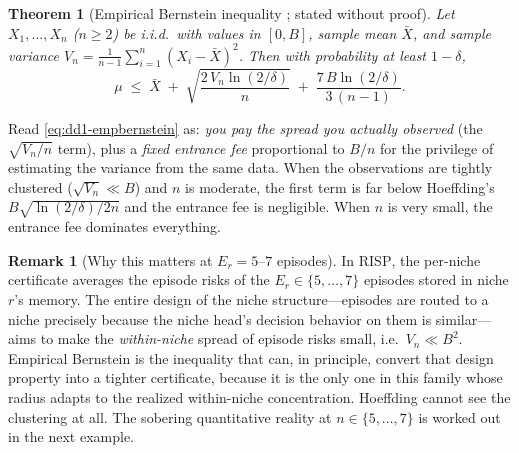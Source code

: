 \documentclass[11pt,a4paper]{article}
\theoremstyle{definition}
\newtheorem{remark}{Remark}[section]
\theoremstyle{plain}
\newtheorem{theorem}{Theorem}[section]
\newcommand{\nm}{\textsc{RISP}}
\begin{document}
\begin{theorem}[Empirical Bernstein inequality \cite{maurer2009empirical};
stated without proof]
\label{thm:dd1-empbernstein}
Let $X_1, \dots, X_n$ ($n \ge 2$) be i.i.d.\ with values in $[0, B]$, sample
mean $\bar{X}$, and sample variance
$V_n = \frac{1}{n - 1}\sum_{i=1}^n (X_i - \bar{X})^2$. Then with probability
at least $1 - \delta$,
\begin{equation}
\label{eq:dd1-empbernstein}
\mu \;\le\; \bar{X} \;+\; \sqrt{ \frac{2\, V_n \ln(2/\delta)}{n} }
\;+\; \frac{7\, B \ln(2/\delta)}{3\,(n - 1)} .
\end{equation}
\end{theorem}

\begin{intuition}
Read \eqref{eq:dd1-empbernstein} as: \emph{you pay the spread you actually
observed} (the $\sqrt{V_n/n}$ term), plus a \emph{fixed entrance fee}
proportional to $B/n$ for the privilege of estimating the variance from the
same data. When the observations are tightly clustered ($\sqrt{V_n} \ll B$)
and $n$ is moderate, the first term is far below Hoeffding's
$B\sqrt{\ln(2/\delta)/2n}$ and the entrance fee is negligible. When $n$ is
very small, the entrance fee dominates everything.
\end{intuition}

\begin{remark}[Why this matters at $E_r = 5$--$7$ episodes]
\label{rem:dd1-small-n}
In \nm{}, the per-niche certificate averages the episode risks of the
$E_r \in \{5, \dots, 7\}$ episodes stored in niche $r$'s memory. The entire
design of the niche structure---episodes are routed to a niche precisely
because the niche head's decision behavior on them is similar---aims to make
the \emph{within-niche} spread of episode risks small, i.e.\ $V_n \ll B^2$.
Empirical Bernstein is the inequality that can, in principle, convert that
design property into a tighter certificate, because it is the only one in
this family whose radius adapts to the realized within-niche concentration.
Hoeffding cannot see the clustering at all. The sobering quantitative reality
at $n \in \{5, \dots, 7\}$ is worked out in the next example.
\end{remark}
\end{document}
